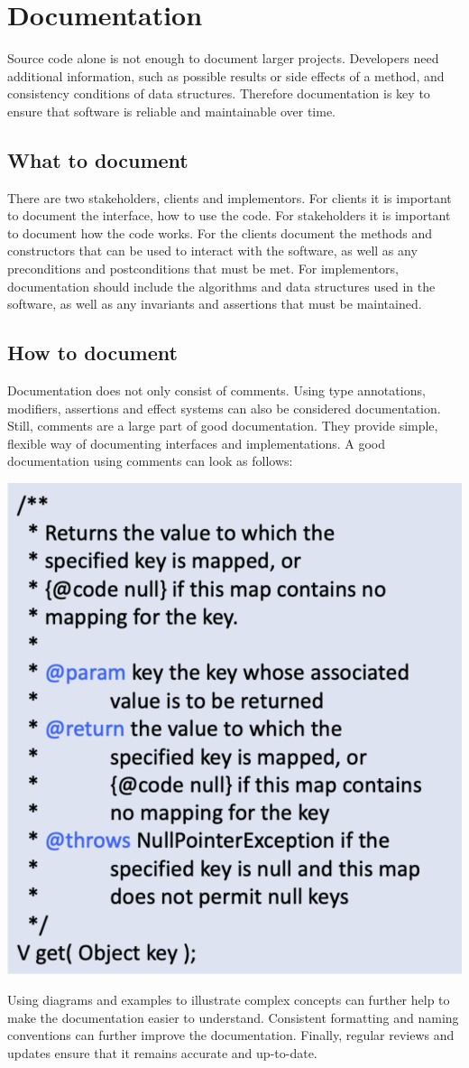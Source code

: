 \section{Documentation}

Source code alone is not enough to document larger projects. Developers need additional information, such as possible results or side effects of a method, and consistency conditions of data structures. Therefore documentation is key to ensure that software is reliable and maintainable over time.

\subsection{What to document}

There are two stakeholders, clients and implementors. For clients it is important to document the interface, how to use the code. For stakeholders it is important to document how the code works. For the clients document the methods and constructors that can be used to interact with the software, as well as any preconditions and postconditions that must be met. For implementors, documentation should include the algorithms and data structures used in the software, as well as any invariants and assertions that must be maintained.

\subsection{How to document}

Documentation does not only consist of comments. Using type annotations, modifiers, assertions and effect systems can also be considered documentation. Still, comments are a large part of good documentation. They provide simple, flexible way of documenting interfaces and implementations. A good documentation using comments can look as follows:

\begin{center}
	\includegraphics[width=0.5\columnwidth]{assets/comment}
\end{center}

Using diagrams and examples to illustrate complex concepts can further help to make the documentation easier to understand. Consistent formatting and naming conventions can further improve the documentation. Finally, regular reviews and updates ensure that it remains accurate and up-to-date.